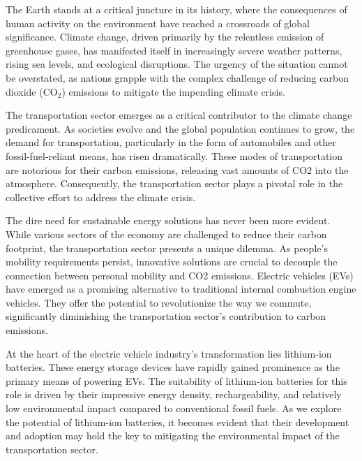 
The Earth stands at a critical juncture in its history, where the consequences of human activity on the environment have reached a crossroads of global significance. Climate change, driven primarily by the relentless emission of greenhouse gases, has manifested itself in increasingly severe weather patterns, rising sea levels, and ecological disruptions. The urgency of the situation cannot be overstated, as nations grapple with the complex challenge of reducing carbon dioxide (CO$_2$) emissions to mitigate the impending climate crisis. 

The transportation sector emerges as a critical contributor to the climate change predicament. As societies evolve and the global population continues to grow, the demand for transportation, particularly in the form of automobiles and other fossil-fuel-reliant means, has risen dramatically. These modes of transportation are notorious for their carbon emissions, releasing vast amounts of CO2 into the atmosphere. Consequently, the transportation sector plays a pivotal role in the collective effort to address the climate crisis. 

The dire need for sustainable energy solutions has never been more evident. While various sectors of the economy are challenged to reduce their carbon footprint, the transportation sector presents a unique dilemma. As people's mobility requirements persist, innovative solutions are crucial to decouple the connection between personal mobility and CO2 emissions. Electric vehicles (EVs) have emerged as a promising alternative to traditional internal combustion engine vehicles. They offer the potential to revolutionize the way we commute, significantly diminishing the transportation sector's contribution to carbon emissions. 

At the heart of the electric vehicle industry's transformation lies lithium-ion batteries. These energy storage devices have rapidly gained prominence as the primary means of powering EVs. The suitability of lithium-ion batteries for this role is driven by their impressive energy density, rechargeability, and relatively low environmental impact compared to conventional fossil fuels. As we explore the potential of lithium-ion batteries, it becomes evident that their development and adoption may hold the key to mitigating the environmental impact of the transportation sector. 

